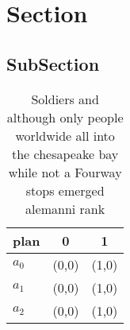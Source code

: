 \documentclass[a4paper]{article}
\begin{document}
\section{Section}

\subsection{SubSection}

\begin{table}
\begin{adjustbox}{width=0.9\columnwidth}
\begin{tabular}{|l|l|l|}
\hline
\textbf{plan} & \multicolumn{1}{c|}{\textbf{0}} & \multicolumn{1}{c|}{\textbf{1}} \\ \hline
\textbf{$a_0$}  & (0,0) & (1,0) \\ \hline
\textbf{$a_1$}  & (0,0) & (1,0) \\ \hline
\textbf{$a_2$}  & (0,0) & (1,0) \\ \hline
\end{tabular}
\end{adjustbox}
\caption{Soldiers and although only people worldwide all into the chesapeake bay while not a Fourway stops emerged alemanni rank
}
\end{table}
\end{document}
